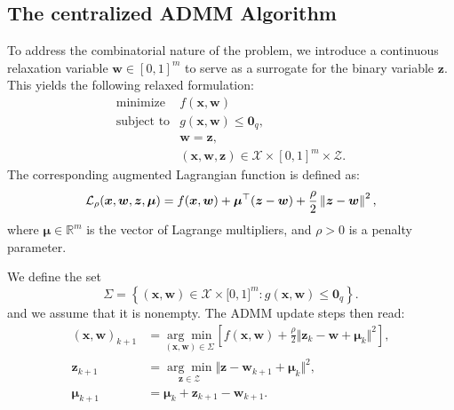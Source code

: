 \documentclass[11pt,a4paper]{article}
\theoremstyle{plain}
\theoremstyle{definition}
\theoremstyle{remark}
\begin{document}
	\subsection{The centralized ADMM Algorithm}
	To address the combinatorial nature of the problem, we introduce a
	continuous relaxation variable $\boldsymbol{w} \in [0,1]^m $ to serve as a
	surrogate for the binary variable $\boldsymbol{z} $. This yields the
	following relaxed formulation: 
	\begin{equation*}
		\begin{array}{ll}
			\text{minimize} & f(\boldsymbol{x}, \boldsymbol{w}) \\ 
			\text{subject to} & g(\boldsymbol{x}, \boldsymbol{w}) \leq \boldsymbol{0}_q, \\ 
			& \boldsymbol{w} = \boldsymbol{z}, \\ 
			& (\boldsymbol{x}, \boldsymbol{w}, \boldsymbol{z}) \in \mathcal{X} \times
			[0,1]^m \times \mathcal{Z}.%
		\end{array}%
	\end{equation*}
	The corresponding augmented Lagrangian function is defined as: 
	\begin{equation*}
		\mathcal{L}_{\rho }(\boldsymbol{x},\boldsymbol{w},\boldsymbol{z},\boldsymbol{%
			\mu })=f(\boldsymbol{x},\boldsymbol{w})+\boldsymbol{\mu }^{\top }(%
		\boldsymbol{z}-\boldsymbol{w})+\frac{\rho }{2}\left\Vert \boldsymbol{z}-%
		\boldsymbol{w}\right\Vert^{2},
	\end{equation*}%
	where $\boldsymbol{\mu }\in \mathbb{R}^{m}$ is the vector of Lagrange
	multipliers, and $\rho >0$ is a penalty parameter.
	
	We define the set 
	\begin{equation*}
		\Sigma =\left\{ (\boldsymbol{x},\boldsymbol{w})\in \mathcal{X}\times \lbrack
		0,1]^{m}:g(\boldsymbol{x},\boldsymbol{w})\leq \boldsymbol{0}_q\right\} .
	\end{equation*}
	and we assume that it is nonempty. The ADMM update steps then read: 
	\begin{subequations}
		\label{eq:admm_updates}
		\begin{align}
			(\boldsymbol{x},\boldsymbol{w})_{k+1}& =\underset{(\boldsymbol{x},%
				\boldsymbol{w})\in \Sigma }{\arg \min }\left[ f(\boldsymbol{x},\boldsymbol{w}%
			)+\frac{\rho }{2}\Vert \boldsymbol{z}_{k}-\boldsymbol{w}+\boldsymbol{\mu }%
			_{k}\Vert^{2}\right] ,  \label{AA1} \\[1ex]
			\boldsymbol{z}_{k+1}& =\underset{\boldsymbol{z}\in \mathcal{Z}}{\arg \min }%
			\Vert \boldsymbol{z}-\boldsymbol{w}_{k+1}+\boldsymbol{\mu }_{k}\Vert^{2},  \label{AA2} \\[1ex]
			\boldsymbol{\mu }_{k+1}& =\boldsymbol{\mu }_{k}+\boldsymbol{z}_{k+1}-%
			\boldsymbol{w}_{k+1}.  \label{AA3}
		\end{align}
	\end{subequations}
	
\end{document}
